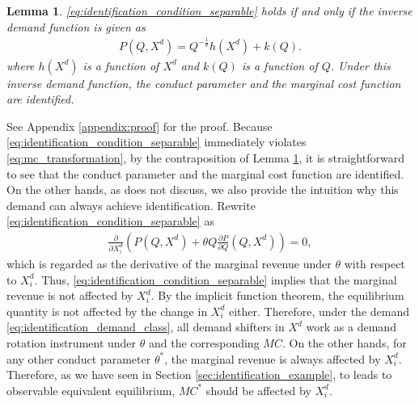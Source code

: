 \documentclass[11pt, a4paper]{article}
\newtheorem{lemma}{Lemma}
\theoremstyle{remark}
\begin{document}
\begin{lemma}\label{lemma:identification_condition_separable}
    \eqref{eq:identification_condition_separable} holds if and only if the inverse demand function is given as
    \begin{align}
        P(Q, X^{d}) = Q^{-\frac{1}{\theta}}h(X^{d}) + k(Q). \label{eq:identification_demand_class}
    \end{align}
    where $h(X^{d})$ is a function of $X^{d}$ and $k(Q)$ is a function of $Q$.
    Under this inverse demand function, the conduct parameter and the marginal cost function are identified.
\end{lemma}
See Appendix \ref{appendix:proof} for the proof.
Because \eqref{eq:identification_condition_separable} immediately violates \eqref{eq:mc_transformation}, by the contraposition of Lemma \ref{lemma:identification_condition_separable}, it is straightforward to see that the conduct parameter and the marginal cost function are identified.
On the other hands, as \citet{lau1982identifying} does not discuss, we also provide the intuition why this demand can always achieve identification.
Rewrite \eqref{eq:identification_condition_separable} as
\begin{align}
    \frac{\partial }{\partial X^{d}_i}\left( P(Q, X^{d}) + \theta Q \frac{\partial P}{\partial Q}(Q, X^{d})\right) = 0,
\end{align}
which is regarded as the derivative of the marginal revenue under $\theta$ with respect to $X^{d}_i$.
Thus, \eqref{eq:identification_condition_separable} implies that the marginal revenue is not affected by $X^{d}_i$.
By the implicit function theorem, the equilibrium quantity is not affected by the change in $X^{d}_i$ either.
Therefore, under the demand \eqref{eq:identification_demand_class}, all demand shifters in $X^{d}$ work as a demand rotation instrument under $\theta$ and the corresponding $MC$.
On the other hands, for any other conduct parameter $\theta^{*}$, the marginal revenue is always affected by $X^{d}_i$.
Therefore, as we have seen in Section \ref{sec:identification_example}, to leads to observable equivalent equilibrium, $MC^{*}$ should be affected by $X^{d}_i$.
\end{document}
